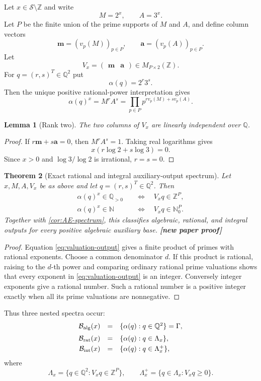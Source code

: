 \documentclass[11pt,oneside]{article}
\newtheorem{theorem}{Theorem}[section]
\newtheorem{lemma}[theorem]{Lemma}
\theoremstyle{definition}
\theoremstyle{remark}
\newcommand{\N}{\mathbb N}
\newcommand{\Nzero}{\mathbb N_0}
\newcommand{\Z}{\mathbb Z}
\newcommand{\Q}{\mathbb Q}
\newcommand{\Sol}{\mathcal S}
\newcommand{\vpp}[2]{v_{#1}\!\left(#2\right)}
\newcommand{\statusnew}{\textcolor{NewViolet}{\textbf{[new paper proof]}}}
\begin{document}
Let $x\in\Sol\setminus\Z$ and write
\[
  M=2^x,\qquad A=3^x.
\]
Let $P$ be the finite union of the prime supports of $M$ and $A$, and define column vectors
\[
  \mathbf m=(\vpp pM)_{p\in P},
  \qquad
  \mathbf a=(\vpp pA)_{p\in P}.
\]
Let
\[
  V_x=\begin{pmatrix}\mathbf m&\mathbf a\end{pmatrix}
  \in M_{P\times2}(\Z).
\]
For $q=(r,s)^T\in\Q^2$ put
\[
  \alpha(q)=2^r3^s.
\]
Then the unique positive rational-power interpretation gives
\[
  \alpha(q)^x=M^rA^s
  =\prod_{p\in P}p^{r\vpp pM+s\vpp pA}.               \tag{6.1}\label{eq:valuation-output}
\]

\begin{lemma}[Rank two]\label{lem:V-rank-two}
The two columns of $V_x$ are linearly independent over $\Q$.
\end{lemma}

\begin{proof}
If $r\mathbf m+s\mathbf a=0$, then $M^rA^s=1$.  Taking real logarithms gives
\[
  x(r\log2+s\log3)=0.
\]
Since $x>0$ and $\log3/\log2$ is irrational, $r=s=0$.
\end{proof}

\begin{theorem}[Exact rational and integral auxiliary-output spectrum]
\label{thm:rational-integral-spectrum}
Let $x,M,A,V_x$ be as above and let $q=(r,s)^T\in\Q^2$.  Then
\begin{align*}
 \alpha(q)^x\in\Q_{>0}
 &\quad\Longleftrightarrow\quad V_xq\in\Z^P,\\
 \alpha(q)^x\in\N
 &\quad\Longleftrightarrow\quad V_xq\in\Nzero^P.
\end{align*}
Together with \cref{cor:AE-spectrum}, this classifies algebraic, rational, and integral
outputs for every positive algebraic auxiliary base.  \statusnew
\end{theorem}

\begin{proof}
Equation \eqref{eq:valuation-output} gives a finite product of primes with rational exponents.
Choose a common denominator $d$.  If this product is rational, raising to the $d$-th power and
comparing ordinary rational prime valuations shows that every exponent in
\eqref{eq:valuation-output} is an integer.  Conversely integer exponents give a rational
number.  Such a rational number is a positive integer exactly when all its prime valuations
are nonnegative.
\end{proof}

Thus three nested spectra occur:
\[
 \begin{array}{rcl}
 \mathcal B_{\rm alg}(x)
  &=&\{\alpha(q):q\in\Q^2\}=\Gamma,\\[2mm]
 \mathcal B_{\rm rat}(x)
  &=&\{\alpha(q):q\in\Lambda_x\},\\[1mm]
 \mathcal B_{\rm int}(x)
  &=&\{\alpha(q):q\in\Lambda_x^+\},
 \end{array}
\]
where
\[
 \Lambda_x=\{q\in\Q^2:V_xq\in\Z^P\},
 \qquad
 \Lambda_x^+=\{q\in\Lambda_x:V_xq\ge0\}.
\]
\end{document}
